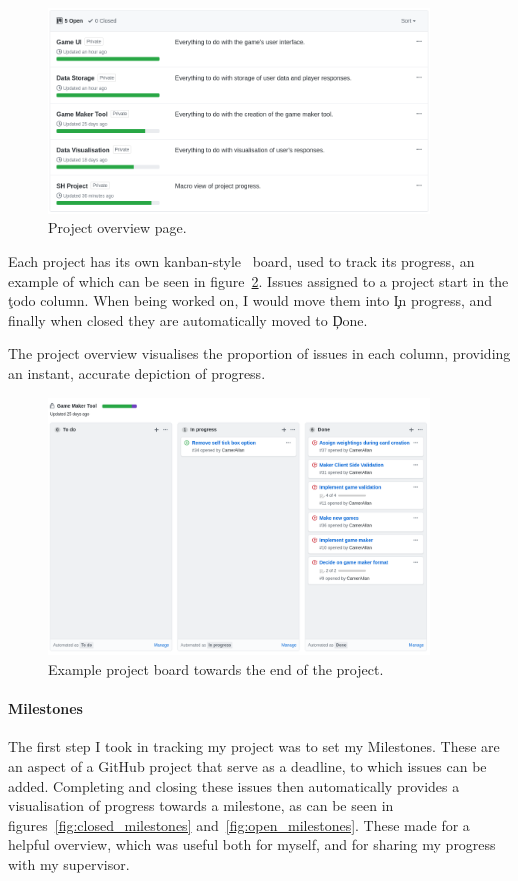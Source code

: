 \begin{figure}[!h]
	\centering
	\includegraphics[width=0.9\textwidth]{./images/softeng/projects.png}
	\caption{Project overview page.}
	\label{fig:projects}
\end{figure}

Each project has its own kanban-style~\cite{KBAN} board, used to track its progress, an example of which can be seen in figure~\ref{fig:board}. Issues assigned to a project start in the \c{todo} column. When being worked on, I would move them into \c{In progress}, and finally when closed they are automatically moved to \c{Done}.

The project overview visualises the proportion of issues in each column, providing an instant, accurate depiction of progress.

\begin{figure}[!h]
	\centering
	\includegraphics[width=0.9\textwidth]{./images/softeng/board.png}
	\caption{Example project board towards the end of the project.}
	\label{fig:board}
\end{figure}

\paragraph{Milestones} The first step I took in tracking my project was to set my Milestones. These are an aspect of a GitHub project that serve as a deadline, to which issues can be added. 
Completing and closing these issues then automatically provides a visualisation of progress towards a milestone, as can be seen in figures~\ref{fig:closed_milestones} and~\ref{fig:open_milestones}. 
These made for a helpful overview, which was useful both for myself, and for sharing my progress with my supervisor.

